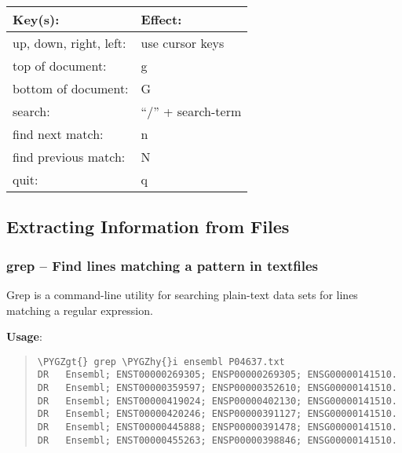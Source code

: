 \documentclass[a4paper,11pt,english]{sphinxmanual}
\def\PYGZgt{\char`\>}
\def\PYGZhy{\char`\-}
\begin{document}
\begin{tabulary}{\linewidth}{|L|L|}
\hline
\textbf{
Key(s):
} & \textbf{
Effect:
}\\\hline

up, down, right, left:
 & 
use cursor keys
\\\hline

top of document:
 & 
g
\\\hline

bottom of document:
 & 
G
\\\hline

search:
 & 
“/” + search-term
\\\hline

find next match:
 & 
n
\\\hline

find previous match:
 & 
N
\\\hline

quit:
 & 
q
\\\hline
\end{tabulary}



\subsection{Extracting Information from Files}
\label{introduction:extracting-information-from-files}

\subsubsection{grep – Find lines matching a pattern in textfiles}
\label{introduction:grep-find-lines-matching-a-pattern-in-textfiles}
Grep is a command-line utility for searching plain-text data sets for lines matching a regular expression.

\textbf{Usage}:  
\begin{quote}

\begin{Verbatim}[frame=single, rulecolor=\color{lightgray}, fontfamily=courier, commandchars=\\\{\}]
\PYGZgt{} grep \PYGZhy{}i ensembl P04637.txt
DR   Ensembl; ENST00000269305; ENSP00000269305; ENSG00000141510.
DR   Ensembl; ENST00000359597; ENSP00000352610; ENSG00000141510.
DR   Ensembl; ENST00000419024; ENSP00000402130; ENSG00000141510.
DR   Ensembl; ENST00000420246; ENSP00000391127; ENSG00000141510.
DR   Ensembl; ENST00000445888; ENSP00000391478; ENSG00000141510.
DR   Ensembl; ENST00000455263; ENSP00000398846; ENSG00000141510.
\end{Verbatim}
\end{quote}
\end{document}
